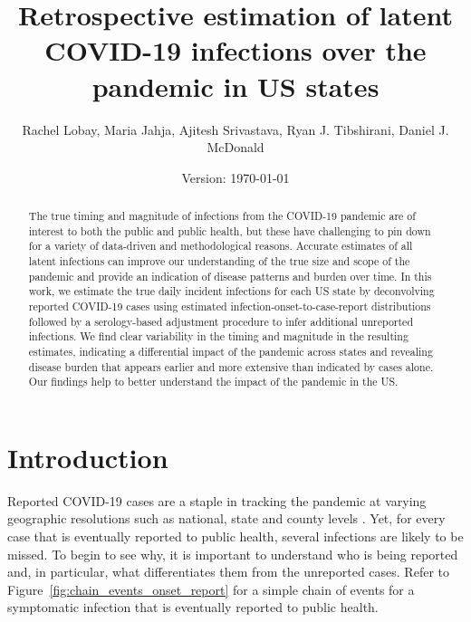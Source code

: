 \documentclass{article}
\begin{document}
\title{Retrospective estimation of latent COVID-19 infections over the pandemic in US states}
\author{Rachel Lobay, Maria Jahja, Ajitesh Srivastava, Ryan J. Tibshirani, Daniel J. McDonald}
\date{Version: \today}
\maketitle

\begin{abstract}
The true timing and magnitude of infections from the COVID-19 pandemic are of interest to both the public and public health, but these have challenging to pin down for a variety of data-driven and methodological reasons. Accurate estimates of all latent infections can improve our understanding of the true size and scope of the pandemic and provide an indication of disease patterns and burden over time. In this work, we estimate the true daily incident infections for each US state by deconvolving reported COVID-19 cases using estimated infection-onset-to-case-report distributions followed by a serology-based adjustment procedure to infer additional unreported infections. We find clear variability in the timing and magnitude in the resulting estimates, indicating a differential impact of the pandemic across states and revealing disease burden that appears earlier and more extensive than indicated by cases alone. Our findings help to better understand the impact of the pandemic in the US.
\end{abstract}

\section{Introduction}

Reported COVID-19 cases are a staple in tracking the pandemic at varying geographic resolutions such as national, state and county levels \citep{dong2020interactive, nyt2020corona, wp2020tracking}. Yet, for every case that is eventually reported to public health, several infections are likely to be missed. To begin to see why, it is important to understand who is being reported and, in particular, what differentiates them from the unreported cases. Refer to Figure~\ref{fig:chain_events_onset_report} for a simple chain of events for a symptomatic infection that is eventually reported to public health.  
\end{document}
